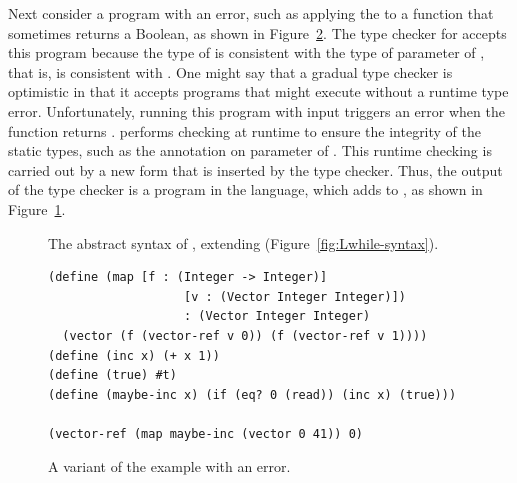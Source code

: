 \documentclass[7x10]{TimesAPriori_MIT}%
\newcommand{\gray}[1]{{\color{gray} #1}}
\begin{document}
Next consider a program with an error, such as applying the
 to a function that sometimes returns a Boolean, as
shown in Figure~\ref{fig:map-maybe-inc}.  The type checker for
\LangGrad{} accepts this program because the type of  is
consistent with the type of parameter  of , that
is,  is consistent with . One might say that a gradual type checker is optimistic
in that it accepts programs that might execute without a runtime type
error.
%
Unfortunately, running this program with input  triggers an
error when the  function returns . \LangGrad{}
performs checking at runtime to ensure the integrity of the static
types, such as the  annotation on parameter
 of .  This runtime checking is carried out by a
new  form that is inserted by the type checker.  Thus, the
output of the type checker is a program in the \LangCast{} language, which
adds  to \LangLoop{}, as shown in
Figure~\ref{fig:Rgrad-prime-syntax}.

\begin{figure}[tp]
\centering
\fbox{
\begin{minipage}{0.96\textwidth}
\small
\[
\begin{array}{lcl}
  \Exp &::=& \ldots \MID \CAST{\Exp}{\Type}{\Type} \\
  \LangCastM{} &::=& \gray{ \PROGRAMDEFSEXP{\code{'()}}{\LP\Def\ldots\RP}{\Exp} }
\end{array}
\]
\end{minipage}
}
\caption{The abstract syntax of \LangCast{}, extending \LangLoop{} (Figure~\ref{fig:Lwhile-syntax}).}
\label{fig:Rgrad-prime-syntax}
\end{figure}


\begin{figure}[tbp]
\begin{lstlisting}
(define (map [f : (Integer -> Integer)]
                   [v : (Vector Integer Integer)])
                   : (Vector Integer Integer)
  (vector (f (vector-ref v 0)) (f (vector-ref v 1))))
(define (inc x) (+ x 1))
(define (true) #t)
(define (maybe-inc x) (if (eq? 0 (read)) (inc x) (true)))

(vector-ref (map maybe-inc (vector 0 41)) 0)
\end{lstlisting}
\caption{A variant of the  example with an error.}
\label{fig:map-maybe-inc}
\end{figure}
\end{document}
